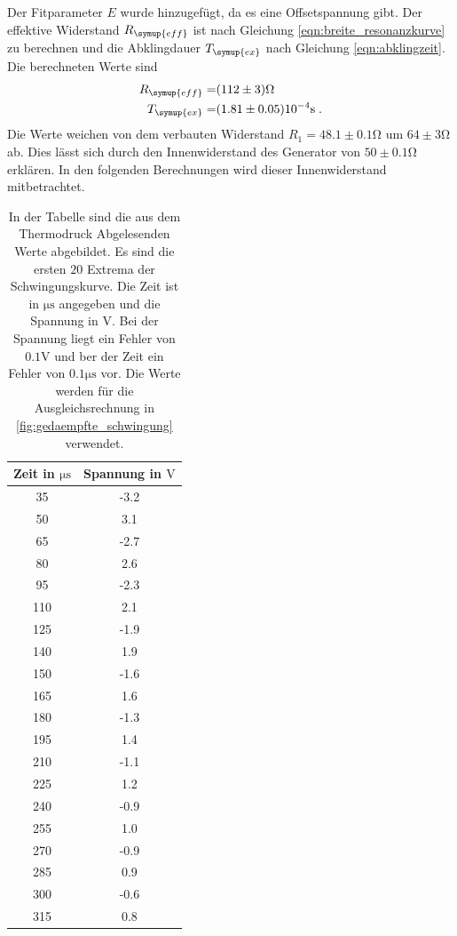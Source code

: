 Der Fitparameter $E$ wurde hinzugefügt, da es eine Offsetspannung gibt.
Der effektive Widerstand $R_{\symup{eff}}$ ist nach Gleichung \eqref{eqn:breite_resonanzkurve}
 zu berechnen und
die Abklingdauer $T_{\symup{ex}}$ nach Gleichung \eqref{eqn:abklingzeit}. Die berechneten
Werte sind
\begin{align*}
    R_{\symup{eff}}=&(112\pm3)\si{\ohm}\\
    T_{\symup{ex}}=&(1.81\pm0.05)10^{-4}\si{\second}\;.
\end{align*}
Die Werte weichen von dem verbauten Widerstand $R_1=48.1\pm0.1\si{\ohm}$ um $64\pm3\si{\ohm}$
ab. Dies lässt sich durch den Innenwiderstand des Generator von $50\pm0.1\si{\ohm}$ erklären.
In den folgenden Berechnungen wird dieser Innenwiderstand mitbetrachtet.
\begin{table}
  \centering
  \begin{tabular}{c c}
    \toprule
    Zeit in $\si{\micro\second}$ & Spannung in $\si{\volt}$  \\
    \midrule
     35  &  -3.2  \\
     50  &   3.1  \\
     65  &  -2.7  \\
     80  &   2.6  \\
     95  &  -2.3  \\
    110  &   2.1  \\
    125  &  -1.9  \\
    140  &   1.9  \\
    150  &  -1.6  \\
    165  &   1.6  \\
    180  &  -1.3  \\
    195  &   1.4  \\
    210  &  -1.1  \\
    225  &   1.2  \\
    240  &  -0.9  \\
    255  &   1.0  \\
    270  &  -0.9  \\
    285  &   0.9  \\
    300  &  -0.6  \\
    315  &   0.8  \\
    \bottomrule
  \end{tabular}
  \caption{In der Tabelle sind die aus dem Thermodruck Abgelesenden Werte abgebildet.
           Es sind die ersten $20$ Extrema der Schwingungskurve. Die Zeit ist
            in  $\si{\micro\second}$ angegeben und die Spannung in $\si{\volt}$.
            Bei der Spannung liegt ein Fehler von $0.1\si{\volt}$ und ber der Zeit
            ein Fehler von $0.1\si{\micro\second}$ vor. Die Werte werden für die
            Ausgleichsrechnung in \ref{fig:gedaempfte_schwingung} verwendet.}
  \label{fig:Messwertegedaempfteschwingung}
\end{table}
